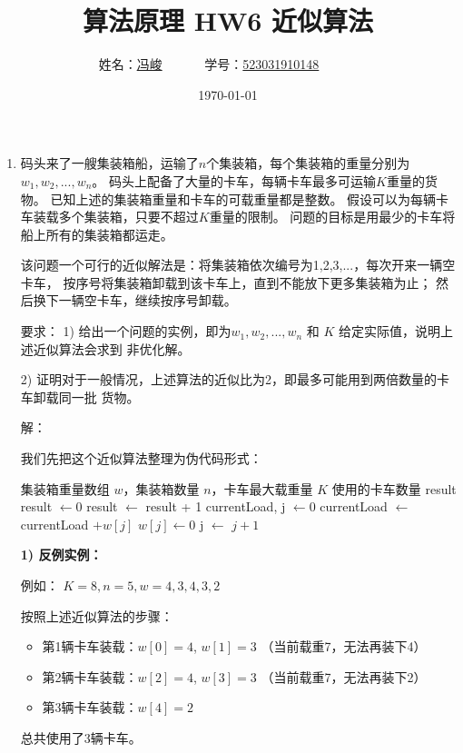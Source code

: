 \documentclass[UTF8,12pt,a4paper]{ctexart}
\title{算法原理 HW6 近似算法}
\author{
	姓名：\underline{冯峻}~~~~~~
	学号：\underline{523031910148}~~~~~~}
\date{\today}
\begin{document}
\fancyfoot[C]{\thepage}

\maketitle


\begin{enumerate}[1.]
	\item 码头来了一艘集装箱船，运输了$n$个集装箱，每个集装箱的重量分别为$w_1,w_2,...,w_n$。
	码头上配备了大量的卡车，每辆卡车最多可运输$K$重量的货物。
	已知上述的集装箱重量和卡车的可载重量都是整数。
	假设可以为每辆卡车装载多个集装箱，只要不超过$K$重量的限制。
	问题的目标是用最少的卡车将船上所有的集装箱都运走。

	该问题一个可行的近似解法是：将集装箱依次编号为1,2,3,...，每次开来一辆空卡车，
	按序号将集装箱卸载到该卡车上，直到不能放下更多集装箱为止；
	然后换下一辆空卡车，继续按序号卸载。
	
	要求：
	1) 给出一个问题的实例，即为$w_1,w_2,...,w_n$ 和 $K$ 给定实际值，说明上述近似算法会求到
	非优化解。

	2) 证明对于一般情况，上述算法的近似比为2，即最多可能用到两倍数量的卡车卸载同一批
	货物。

	解：

	我们先把这个近似算法整理为伪代码形式：
	\begin{algorithm}[H]
		\caption{APPROXIMATE-TRUCKS($w, n, K$)}
		\begin{algorithmic}[1]
			\Require 集装箱重量数组 $w$，集装箱数量 $n$，卡车最大载重量 $K$
			\Ensure 使用的卡车数量 result
			\State result $\gets 0$
				\State result $\gets$ result + 1
				\State currentLoad, j $\gets 0$
					\State currentLoad $\gets$ currentLoad $+ w[j]$
					\State $w[j] \gets 0$
					\State j $\gets$ $j+1$
				\EndWhile
			\EndWhile
			\State {}
		\end{algorithmic}
	\end{algorithm}


	\textbf{1) 反例实例：} 

	例如： $K = 8, n = 5, w = {4,3,4,3,2}$

	按照上述近似算法的步骤：
	\begin{itemize}
		\item 第1辆卡车装载：$w[0] = 4$, $w[1] = 3$ （当前载重7，无法再装下4）
		\item 第2辆卡车装载：$w[2] = 4$, $w[3] = 3$ （当前载重7，无法再装下2）
		\item 第3辆卡车装载：$w[4] = 2$
	\end{itemize}
	总共使用了3辆卡车。


\end{enumerate}
\end{document}
